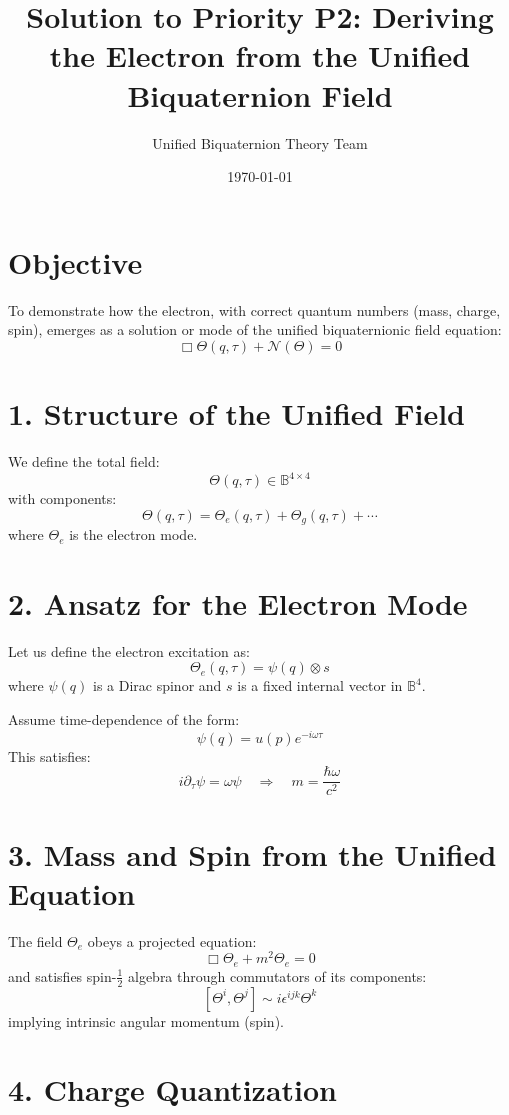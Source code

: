 \documentclass[12pt]{article}
\title{Solution to Priority P2: Deriving the Electron from the Unified Biquaternion Field}
\author{Unified Biquaternion Theory Team}
\date{\today}
\begin{document}
\maketitle

\section*{Objective}

To demonstrate how the electron, with correct quantum numbers (mass, charge, spin), emerges as a solution or mode of the unified biquaternionic field equation:
\[
\Box \Theta(q, \tau) + \mathcal{N}(\Theta) = 0
\]

\section*{1. Structure of the Unified Field}

We define the total field:
\[
\Theta(q, \tau) \in \mathbb{B}^{4 \times 4}
\]
with components:
\[
\Theta(q, \tau) = \Theta_e(q, \tau) + \Theta_g(q, \tau) + \cdots
\]
where $\Theta_e$ is the electron mode.

\section*{2. Ansatz for the Electron Mode}

Let us define the electron excitation as:
\[
\Theta_e(q, \tau) = \psi(q) \otimes s
\]
where $\psi(q)$ is a Dirac spinor and $s$ is a fixed internal vector in $\mathbb{B}^{4}$.

Assume time-dependence of the form:
\[
\psi(q) = u(p) e^{-i \omega \tau}
\]
This satisfies:
\[
i \partial_\tau \psi = \omega \psi \quad \Rightarrow \quad m = \frac{\hbar \omega}{c^2}
\]

\section*{3. Mass and Spin from the Unified Equation}

The field $\Theta_e$ obeys a projected equation:
\[
\Box \Theta_e + m^2 \Theta_e = 0
\]
and satisfies spin-$\frac{1}{2}$ algebra through commutators of its components:
\[
[\Theta^i, \Theta^j] \sim i \epsilon^{ijk} \Theta^k
\]
implying intrinsic angular momentum (spin).

\section*{4. Charge Quantization}
\end{document}
